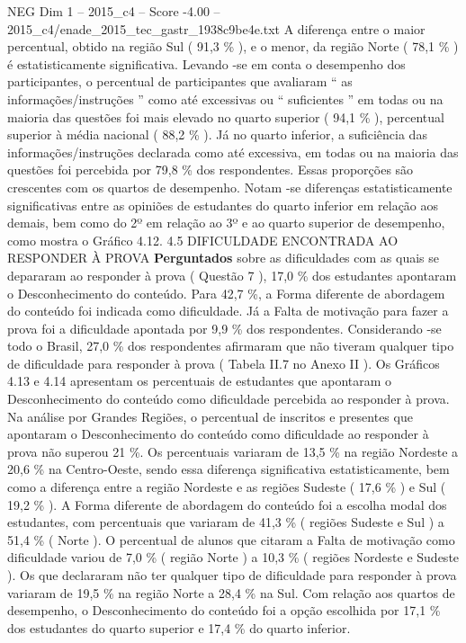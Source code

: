 \begin{textsample}{NEG Dim 1 – 2015\_c4 – Score -4.00 – 2015\_c4/enade\_2015\_tec\_gastr\_1938c9be4e.txt}
A diferença entre o maior percentual, obtido na região Sul ( 91,3 \% ), e o menor, da região Norte ( 78,1 \% ) é estatisticamente significativa.
Levando -se em conta o desempenho dos participantes, o percentual de participantes que avaliaram “ as informações/instruções ” como até excessivas ou “ suficientes ” em todas ou na maioria das questões foi mais elevado no quarto superior ( 94,1 \% ), percentual superior à média nacional ( 88,2 \% ).
Já no quarto inferior, a suficiência das informações/instruções declarada como até excessiva, em todas ou na maioria das questões foi percebida por 79,8 \% dos respondentes.
Essas proporções são crescentes com os quartos de desempenho.
Notam -se diferenças estatisticamente significativas entre as opiniões de estudantes do quarto inferior em relação aos demais, bem como do 2º em relação ao 3º e ao quarto superior de desempenho, como mostra o Gráfico 4.12. 4.5 DIFICULDADE ENCONTRADA AO RESPONDER À PROVA \textbf{Perguntados} sobre as dificuldades com as quais se depararam ao responder à prova ( Questão 7 ), 17,0 \% dos estudantes apontaram o Desconhecimento do conteúdo.
Para 42,7 \%, a Forma diferente de abordagem do conteúdo foi indicada como dificuldade.
Já a Falta de motivação para fazer a prova foi a dificuldade apontada por 9,9 \% dos respondentes.
Considerando -se todo o Brasil, 27,0 \% dos respondentes afirmaram que não tiveram qualquer tipo de dificuldade para responder à prova ( Tabela II.7 no Anexo II ).
Os Gráficos 4.13 e 4.14 apresentam os percentuais de estudantes que apontaram o Desconhecimento do conteúdo como dificuldade percebida ao responder à prova.
Na análise por Grandes Regiões, o percentual de inscritos e presentes que apontaram o Desconhecimento do conteúdo como dificuldade ao responder à prova não superou 21 \%.
Os percentuais variaram de 13,5 \% na região Nordeste a 20,6 \% na Centro-Oeste, sendo essa diferença significativa estatisticamente, bem como a diferença entre a região Nordeste e as regiões Sudeste ( 17,6 \% ) e Sul ( 19,2 \% ).
A Forma diferente de abordagem do conteúdo foi a escolha modal dos estudantes, com percentuais que variaram de 41,3 \% ( regiões Sudeste e Sul ) a 51,4 \% ( Norte ).
O percentual de alunos que citaram a Falta de motivação como dificuldade variou de 7,0 \% ( região Norte ) a 10,3 \% ( regiões Nordeste e Sudeste ).
Os que declararam não ter qualquer tipo de dificuldade para responder à prova variaram de 19,5 \% na região Norte a 28,4 \% na Sul.
Com relação aos quartos de desempenho, o Desconhecimento do conteúdo foi a opção escolhida por 17,1 \% dos estudantes do quarto superior e 17,4 \% do quarto inferior.

\end{textsample}
